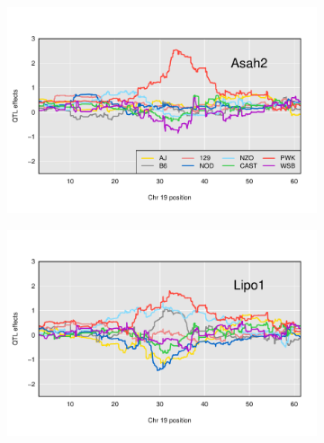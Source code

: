 \documentclass{article}
\begin{document}
\begin{figure}
    \begin{subfigure}[t]{0.5\textwidth}
        \includegraphics[width = \textwidth]{../Rmd/allele_effects_Asah2.pdf}
    \end{subfigure}%
    \begin{subfigure}[t]{0.5\textwidth}
        \includegraphics[width = \textwidth]{../Rmd/allele_effects_Lipo1.pdf}
    \end{subfigure}%
    

\end{figure}
\end{document}
